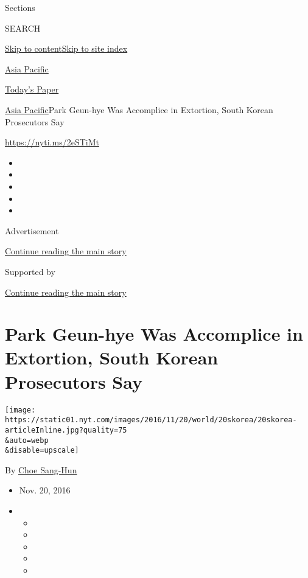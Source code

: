 Sections

SEARCH

\protect\hyperlink{site-content}{Skip to
content}\protect\hyperlink{site-index}{Skip to site index}

\href{https://www.nytimes.com/section/world/asia}{Asia Pacific}

\href{https://myaccount.nytimes.com/auth/login?response_type=cookie\&client_id=vi}{}

\href{https://www.nytimes.com/section/todayspaper}{Today's Paper}

\href{/section/world/asia}{Asia Pacific}\textbar{}Park Geun-hye Was
Accomplice in Extortion, South Korean Prosecutors Say

\url{https://nyti.ms/2eSTiMt}

\begin{itemize}
\item
\item
\item
\item
\item
\end{itemize}

Advertisement

\protect\hyperlink{after-top}{Continue reading the main story}

Supported by

\protect\hyperlink{after-sponsor}{Continue reading the main story}

\hypertarget{park-geun-hye-was-accomplice-in-extortion-south-korean-prosecutors-say}{%
\section{Park Geun-hye Was Accomplice in Extortion, South Korean
Prosecutors
Say}\label{park-geun-hye-was-accomplice-in-extortion-south-korean-prosecutors-say}}

\texttt{[image: https://static01.nyt.com/images/2016/11/20/world/20skorea/20skorea-articleInline.jpg?quality=75\\\&auto=webp\\\&disable=upscale]}

By \href{http://www.nytimes.com/by/choe-sang-hun}{Choe Sang-Hun}

\begin{itemize}
\item
  Nov. 20, 2016
\item
  \begin{itemize}
  \item
  \item
  \item
  \item
  \item
  \end{itemize}
\end{itemize}

